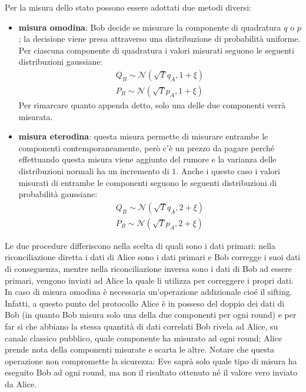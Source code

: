 Per la misura dello stato possono essere adottati due metodi diversi:
\begin{itemize}
\item \textbf{misura omodina}: Bob decide se misurare la componente di quadratura $q$ o $p$; la decisione viene presa attraverso una distribuzione di probabilit\`a uniforme. Per ciascuna componente di quadratura i valori misurati seguono le seguenti distribuzioni gaussiane:
\begin{equation}
\begin{split}
Q_B \sim \mathcal N(\sqrt{T}q_A, 1 + \xi) \\
P_B \sim \mathcal N(\sqrt{T}p_A, 1 + \xi)
\end{split}
\end{equation}
Per rimarcare quanto appenda detto, solo una delle due componenti verr\`a misurata.
\item \textbf{misura eterodina}: questa misura permette di misurare entrambe le componenti contemporaneamente, per\`o c'\`e un prezzo da pagare perch\'e effettuando questa misura viene aggiunto del rumore e la varianza delle distribuzioni normali ha un incremento di $1$. Anche i questo caso i valori misurati di entrambe le componenti seguono le seguenti distribuzioni di probabilit\`a gaussiane:
\begin{equation}
\begin{split}
Q_B \sim \mathcal N(\sqrt{T}q_A, 2 + \xi) \\
P_B \sim \mathcal N(\sqrt{T}p_A, 2 + \xi)
\end{split}
\end{equation}
\end{itemize}  
Le due procedure differiscono nella scelta di quali sono i dati primari: nella riconciliazione diretta i dati di Alice sono i dati primari e Bob corregge i suoi dati di conseguenza, mentre nella riconciliazione inversa sono i dati di Bob ad essere primari, vengono inviati ad Alice la quale li utilizza per correggere i propri dati. 
In caso di misura omodina \`e necessaria un'operazione addizionale cio\'e il sifting. Infatti, a questo punto del protocollo Alice \`e in posseso del doppio dei dati di Bob (in quanto Bob misura solo una della due componenti per ogni round) e per far s\`i che abbiano la stessa quantit\`a di dati correlati Bob rivela ad Alice, su canale classico pubblico, quale componente ha misurato ad ogni round; Alice prende nota della componenti misurate e scarta le altre\cite{milicevic_key_2018}. Notare che questa operazione non compromette la sicurezza: Eve saprà solo quale tipo di misura ha eseguito Bob ad ogni round, ma non il risultato ottenuto né il valore  vero inviato da Alice.

